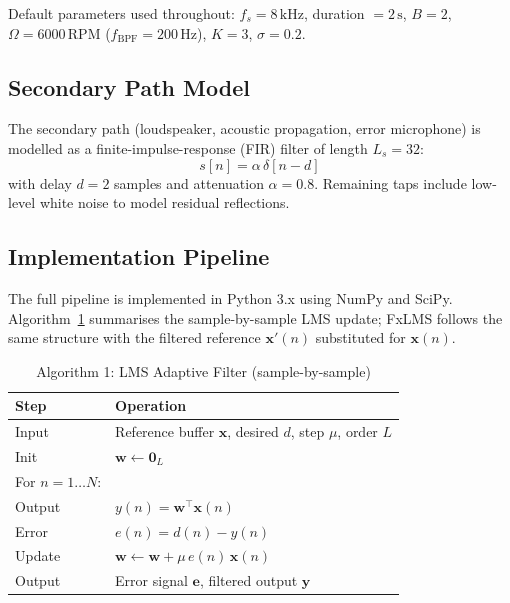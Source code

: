 \documentclass[journal,12pt,onecolumn]{IEEEtran}
\newcommand{\SI}[2]{\ensuremath{#1\,\mathrm{#2}}}
\begin{document}
Default parameters used throughout: $f_s = \SI{8}{kHz}$, duration
$= \SI{2}{s}$, $B=2$, $\Omega=\SI{6000}{RPM}$ ($f_{\text{BPF}}=\SI{200}{Hz}$),
$K=3$, $\sigma=0.2$.

\subsection{Secondary Path Model}

The secondary path (loudspeaker, acoustic propagation, error microphone)
is modelled as a finite-impulse-response (FIR) filter of length $L_s = 32$:
\begin{equation}
  s[n] = \alpha\,\delta[n - d]
  \label{eq:secpath}
\end{equation}
with delay $d = 2$ samples and attenuation $\alpha = 0.8$.
Remaining taps include low-level white noise to model residual reflections.

\subsection{Implementation Pipeline}

The full pipeline is implemented in Python 3.x using NumPy and SciPy.
Algorithm~\ref{alg:lms} summarises the sample-by-sample LMS update; FxLMS
follows the same structure with the filtered reference $\bm{x}'(n)$
substituted for $\bm{x}(n)$.

\begin{table}[t]
  \centering
  \caption{Algorithm 1: LMS Adaptive Filter (sample-by-sample)}
  \label{alg:lms}
  \begin{tabular}{@{}ll@{}}
    \toprule
    \textbf{Step} & \textbf{Operation} \\
    \midrule
    Input  & Reference buffer $\bm{x}$, desired $d$, step $\mu$, order $L$ \\
    Init   & $\bm{w} \leftarrow \bm{0}_L$ \\
    For $n=1\ldots N$: & \\
    \quad Output    & $y(n) = \bm{w}^\top\bm{x}(n)$ \\
    \quad Error     & $e(n) = d(n) - y(n)$ \\
    \quad Update    & $\bm{w} \leftarrow \bm{w} + \mu\,e(n)\,\bm{x}(n)$ \\
    Output & Error signal $\bm{e}$, filtered output $\bm{y}$ \\
    \bottomrule
  \end{tabular}
\end{table}
\end{document}
